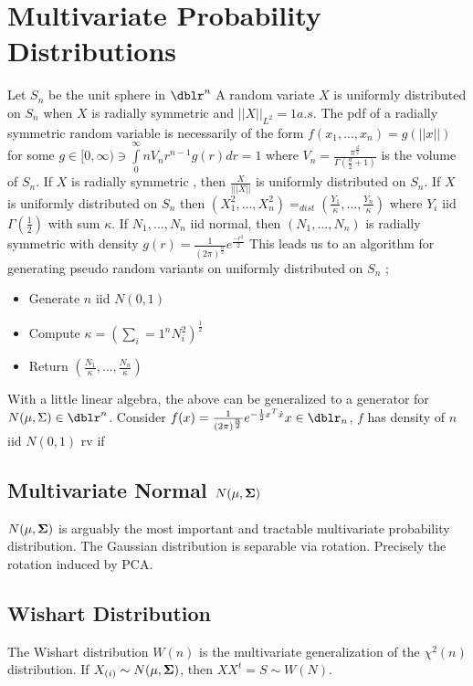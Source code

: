 \section{Multivariate Probability Distributions}

Let $S_n$ be the unit sphere in $\dblr^n$ A random variate $X$
is uniformly distributed on $S_n$ when $X$ is radially
symmetric and $||X||_{L^2} = 1 a.s.$  The pdf of a radially
symmetric random variable is necessarily of the form
$f(x_1,...,x_n)=g(||x||)$ for some $g \in [0,\infty) \ni
\int\limits_{0}^{\infty} n V_n r^{n-1} g(r) dr =1$ where
$V_n=\frac{\pi^{\frac{d}{2}}}{\Gamma(\frac{d}{2}+1) }$ is the
volume of $S_n$. If $X$ is radially symmetric , then
$\frac{X}{|||X||}$ is uniformly distributed on $S_n$.  If $X$
is uniformly distributed on $S_n$ then $(X_1^2, \ldots ,
X_{n}^{2}) =_{dist} (\frac{Y_1}{\kappa} , \ldots ,
\frac{Y_n}{\kappa} )$ where $Y_i$ iid $\Gamma(\frac{1}{2})$
with sum $\kappa$.  If $N_1, \ldots , N_n$ iid normal, then
$(N_1, \ldots , N_n)$ is radially symmetric with density $g(r)
= \frac{1}{(2 \pi)^{\frac{n}{2} } } e^{\frac{ - r^2}{2}}$  This
leads us to an algorithm for generating pseudo random variants
on uniformly distributed on $S_n$ ;
\begin{itemize}
    \item Generate $n$ iid $N(0,1)$
    \item Compute $ \kappa = ( \sum\limits_i=1^n N_i^2
        )^\frac{1}{2}$
    \item Return $(\frac{N_1}{\kappa} , \ldots ,
        \frac{N_n}{\kappa} )$
\end{itemize}
\cite{Devorye}

With a little linear algebra, the above can be generalized to a
generator for $N(\mu, \Sigma ) \in \dblr^n$.  Consider $f(x)
=\frac{1}{(2 \pi)^{\frac{n}{2} } } e^{ - \frac{1}{2} x^T \dot x
} x \in \dblr_n$, $f$ has density of $n$ iid $N(0,1)$ rv if

\subsection{Multivariate Normal $N(\mathbf{\mu},\mathbf{\Sigma})$ }
$N(\mathbf{\mu},\mathbf{\Sigma})$ is arguably the most important and tractable multivariate probability distribution. The Gaussian distribution is separable via rotation.  Precisely the rotation induced by PCA.

\subsection{Wishart Distribution}
The Wishart distribution $W(n)$ is the multivariate generalization of the $\chi^2(n)$ distribution.  If $X_{(i)} \sim N(\mathbf{\mu},\mathbf{\Sigma})$, then
$X X^t =S \sim W(N)$.

